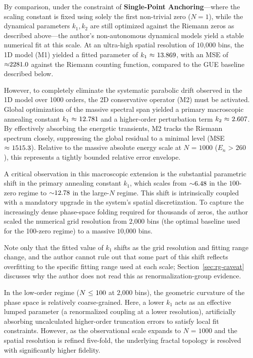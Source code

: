 \documentclass[mca,article,submit,oneauthor,pdftex]{Definitions/mdpi}
\begin{document}
By comparison, under the constraint of
\textbf{Single-Point Anchoring}---where the scaling constant is fixed
using solely the first non-trivial zero (\(N=1\)), while the dynamical
parameters \(k_1,k_2\) are still optimized against the Riemann zeros as
described above---the author's
non-autonomous dynamical models yield a stable numerical fit at this
scale. At an ultra-high
spatial resolution of \(\text{10,000}\) bins, the 1D model (M1) yielded
a fitted parameter of \({k}_{\text{1}}~\text{\ensuremath{\approx}~13.869}\),
with an MSE of \(\text{\ensuremath{\approx}2281.0}\) against the Riemann counting
function, compared to the GUE baseline described below.

However, to completely eliminate the systematic parabolic drift observed
in the 1D model over 1000 orders, the 2D conservative operator (M2) must
be activated. Global optimization of the massive spectral span yielded a
primary macroscopic annealing constant
\({k}_{\text{1}}~\text{\ensuremath{\approx}~12.781}\) and a higher-order perturbation
term \({k}_{\text{2}}~\text{\ensuremath{\approx}~2.607}\). By effectively absorbing the
energetic transients, M2 tracks the Riemann spectrum closely,
suppressing the global residual to a minimal level (MSE
\(\text{\ensuremath{\approx}~1515.3}\)). Relative to the massive absolute energy scale at
\({N}\text{ = 1000}\) (\({E}_{{n}}\text{ > 260}\)), this
represents a tightly bounded relative error envelope.

A critical observation in this macroscopic extension is the substantial
parametric shift in the primary annealing constant
\({k}_{\text{1}}\), which scales from \(\text{\ensuremath{\sim}6.48}\) in the
\(\text{100}\)-zero regime to \(\text{\ensuremath{\sim}12.78}\) in the large-$N$
regime. This shift is intrinsically coupled with a mandatory upgrade in
the system's spatial discretization. To capture the increasingly dense
phase-space folding required for thousands of zeros, the author scaled the
numerical grid resolution from \(\text{2,000}\) bins (the optimal
baseline used for the 100-zero regime) to a massive \(\text{10,000}\)
bins.

Note only that the fitted value of $k_1$ shifts as the grid resolution
and fitting range change, and the author cannot rule out that some part of this
shift reflects overfitting to the specific fitting range used at each
scale; Section~\ref{sec:rg-caveat} discusses why the author does not read this as
renormalization-group evidence.

In the low-order regime (\({N}~\text{\ensuremath{\le} 100}\) at \(\text{2,000}\)
bins), the geometric curvature of the phase space is relatively
coarse-grained. Here, a lower \({k}_{\text{1}}\) acts as an
effective lumped parameter (a renormalized coupling at a lower
resolution), artificially absorbing uncalculated higher-order truncation
errors to satisfy local fit constraints. However, as the observational
scale expands to \({N}\text{~=~1000}\) and the spatial resolution is
refined five-fold, the underlying fractal topology is resolved with
significantly higher fidelity.
\end{document}
